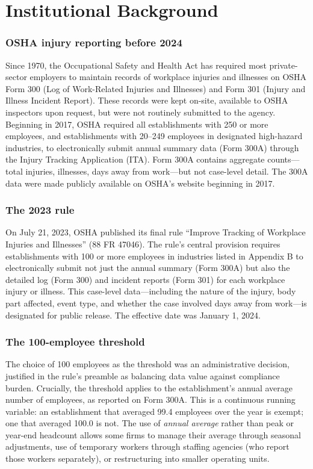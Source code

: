 \documentclass[12pt]{article}
\begin{document}
\section{Institutional Background}\label{sec:background}

\subsubsection*{OSHA injury reporting before 2024} Since 1970, the Occupational Safety and Health Act has required most private-sector employers to maintain records of workplace injuries and illnesses on OSHA Form 300 (Log of Work-Related Injuries and Illnesses) and Form 301 (Injury and Illness Incident Report). These records were kept on-site, available to OSHA inspectors upon request, but were not routinely submitted to the agency. Beginning in 2017, OSHA required all establishments with 250 or more employees, and establishments with 20--249 employees in designated high-hazard industries, to electronically submit annual summary data (Form 300A) through the Injury Tracking Application (ITA). Form 300A contains aggregate counts---total injuries, illnesses, days away from work---but not case-level detail. The 300A data were made publicly available on OSHA's website beginning in 2017.

\subsubsection*{The 2023 rule} On July 21, 2023, OSHA published its final rule ``Improve Tracking of Workplace Injuries and Illnesses'' (88 FR 47046). The rule's central provision requires establishments with 100 or more employees in industries listed in Appendix B to electronically submit not just the annual summary (Form 300A) but also the detailed log (Form 300) and incident reports (Form 301) for each workplace injury or illness. This case-level data---including the nature of the injury, body part affected, event type, and whether the case involved days away from work---is designated for public release. The effective date was January 1, 2024.

\subsubsection*{The 100-employee threshold} The choice of 100 employees as the threshold was an administrative decision, justified in the rule's preamble as balancing data value against compliance burden. Crucially, the threshold applies to the establishment's annual average number of employees, as reported on Form 300A. This is a continuous running variable: an establishment that averaged 99.4 employees over the year is exempt; one that averaged 100.0 is not. The use of \textit{annual average} rather than peak or year-end headcount allows some firms to manage their average through seasonal adjustments, use of temporary workers through staffing agencies (who report those workers separately), or restructuring into smaller operating units.
\end{document}
